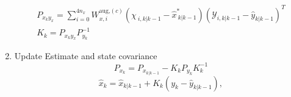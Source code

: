 \begin{enumerate}
\begin{align}
        P_{x_{k}y_{x}} = \sum_{i=0}^{4n_{x}} W^{\text{aug,}(c)}_{x,i} (\chi_{\ i, k|k-1} - \hat{x}^{*}_{\ k|k-1})(\mathcal{Y}_{i, k|k-1} - \hat{y}_{k|k-1})^{T} \\
        K_{k} = P_{x_{k}y_{x}}P^{-1}_{y_{k}}
    \end{align}
    \item Update Estimate and state covariance
    \begin{equation}
        P_{x_{k}} = P_{x_{k|k-1}} - K_{k}P_{y_{k}}K^{-1}_{k} 
    \end{equation}
    \begin{equation}
        \hat{x}_{k} = \hat{x}_{k|k-1} + K_{k}(y_{k}-\hat{y}_{k|k-1}),
    \end{equation}
    
\end{enumerate}